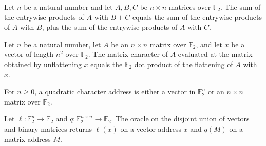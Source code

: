 \begin{theorem}
\label{FABL.binaryMatrixCharacter_add}
\leanok
{}
Let $n$ be a natural number and let $A,B,C$ be $n\times n$ matrices over $\mathbb F_2$.
The sum of the entrywise products of $A$ with $B+C$ equals the sum of the entrywise
products of $A$ with $B$, plus the sum of the entrywise products of $A$ with $C$.
\end{theorem}

\begin{theorem}
\label{FABL.binaryMatrixCharacter_unflattenBinaryMatrix}
\leanok
{}
Let $n$ be a natural number, let $A$ be an $n\times n$ matrix over $\mathbb{F}_2$, and
let $x$ be a vector of length $n^2$ over $\mathbb{F}_2$. The matrix character of $A$
evaluated at the matrix obtained by unflattening $x$ equals the $\mathbb{F}_2$ dot
product of the flattening of $A$ with $x$.
\end{theorem}

\begin{definition}
\label{FABL.QuadraticCharacterAddress}
\leanok
{}
For $n\ge 0$, a quadratic character address is either a vector in $\mathbb{F}_2^n$ or an
$n\times n$ matrix over $\mathbb{F}_2$.
\end{definition}

\begin{definition}
\label{FABL.quadraticCharacterOracle}
\leanok
{}
Let $\ell\colon\mathbb{F}_2^n\to\mathbb{F}_2$ and $q\colon\mathbb{F}_2^{n\times
n}\to\mathbb{F}_2$. The oracle on the disjoint union of vectors and binary matrices
returns $\ell(x)$ on a vector address $x$ and $q(M)$ on a matrix address $M$.
\end{definition}


